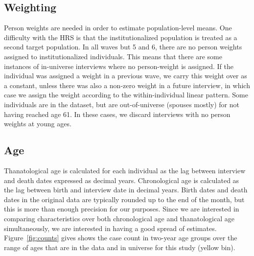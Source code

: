 \documentclass{article}
\begin{document}
\subsection{Weighting}
Person weights
are needed in order to estimate population-level means.
One difficulty with the HRS is that the institutionalized population is treated
as a second target population. In all waves but 5 and 6, there are no person weights
assigned to institutionalized individuals. This means that there are some
instances of in-universe interviews where no person-weight is assigned. If the
individual was assigned a weight in a previous wave, we carry this weight over
as a constant, unless there was also a non-zero weight in a future interview, in
which case we assign the weight according to the within-individual linear
pattern. Some individuals are in the dataset, but are
out-of-universe (spouses mostly) for not having reached age 61. In these
cases, we discard interviews with no person weights at young ages. 

\subsection{Age}
Thanatological age is calculated for each individual as the lag between
interview and death dates expressed as decimal years. Chronological age is
calculated as the lag between birth and interview date in decimal years. Birth
dates and death dates in the original data are typically rounded up to the end
of the month, but this is more than enough precision for our purposes. Since we
are interested in comparing characteristics over both chronological age and
thanatological age simultaneously, we are interested in having a good spread of
estimates. Figure~\ref{fig:counts} gives shows the case count in two-year age
groups over the range of ages that are in the data and in universe for this
study (yellow bin). 
\end{document}
